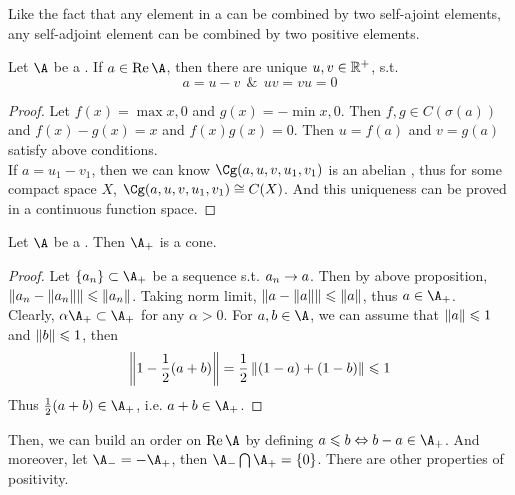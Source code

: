 Like the fact that any element in a \Cs can be combined by two self-ajoint elements, any self-adjoint element can be combined by two positive elements.

\begin{prop}
	Let $\A$ be a \Cs. If $a \in \Rea{\A}$, then there are unique $u,v \in \mathbb{R}^{+}$, s.t.
	\begin{equation*}
		a = u - v ~~\&~~ uv = vu = 0
	\end{equation*}
\end{prop}
\begin{proof}
	Let $f(x) = \max{x,0}$ and $g(x) = - \min{x,0}$. Then $f,g \in C(\sigma(a))$ and $f(x)-g(x)=x$ and $f(x)g(x)=0$. Then $u = f(a)$ and $v = g(a)$ satisfy above conditions.\\
	If $a=u_1-v_1$, then we can know $\Cg(a,u,v,u_1,v_1)$ is an abelian \Cs, thus for some compact space $X$, $\Cg(a,u,v,u_1,v_1) \cong C(X)$. And this uniqueness can be proved in a continuous function space.
\end{proof}

\begin{cor}
	Let $\A$ be a \Cs. Then $\A_{+}$ is a cone.
\end{cor}
\begin{proof}
	Let $\{a_n\} \subset \A_{+}$ be a sequence s.t. $a_n \rightarrow a$. Then by above proposition, $\left\lVert a_n-\left\lVert a_n\right\lVert\right\lVert \leqslant \left\lVert a_n\right\lVert$. Taking norm limit, 
	$\left\lVert a-\left\lVert a\right\lVert\right\lVert \leqslant \left\lVert a\right\lVert$, thus $a \in \A_{+}$.\\
	Clearly, $\alpha \A_{+} \subset \A_{+}$ for any $\alpha >0$. For $a, b \in \A$, we can assume that $\left\lVert a\right\lVert \leqslant 1$ and $\left\lVert b\right\lVert \leqslant 1$, then
	\begin{equation*}
		\left\lVert1-\frac{1}{2}(a+b)\right\lVert = \frac{1}{2}\left\lVert(1-a)+(1-b)\right\lVert \leqslant 1
	\end{equation*}
	Thus $\frac{1}{2}(a+b) \in \A_{+}$, i.e. $a+b \in \A_{+}$.
\end{proof}

Then, we can build an order on $\Rea{\A}$ by defining $a \leqslant b \Leftrightarrow b-a \in \A_{+}$. And moreover, let $\A_{-} = - \A_{+}$, then $\A_{-} \bigcap \A_{+} = \{0\}$. There are other properties of positivity.

